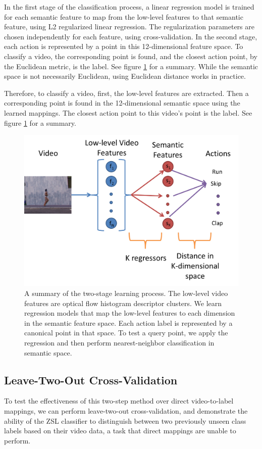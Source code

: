 \documentclass{article}
\begin{document}
In the first stage of the classification process, a linear regression model is trained for each semantic feature to map from the low-level features to that semantic feature, using L2 regularized linear regression. The regularization parameters are chosen independently for each feature, using cross-validation. In the second stage, each action is represented by a point in this 12-dimensional feature space. To classify a video, the corresponding point is found, and the closest action point, by the Euclidean metric, is the label. See figure \ref{2stage} for a summary. While the semantic space is not necessarily Euclidean, using Euclidean distance works in practice.

Therefore, to classify a video, first, the low-level features are extracted. Then a corresponding point is found in the 12-dimensional semantic space using the learned mappings. The closest action point to this video's point is the label. See figure \ref{2stage} for a summary.

\begin{figure}[h]
  \centering
  \includegraphics[width=.5\linewidth]{2stagelearning.png}
  \caption{A summary of the two-stage learning process. The low-level video features are optical flow histogram descriptor clusters. We learn regression models that map the low-level features to each dimension in the semantic feature space. Each action label is represented by a canonical point in that space.  To test a query point, we apply the regression and then perform nearest-neighbor classification in semantic space.}
  \label{2stage}
\end{figure}

\subsection{Leave-Two-Out Cross-Validation}
To test the effectiveness of this two-step method over direct video-to-label mappings, we can perform leave-two-out cross-validation, and demonstrate the ability of the ZSL classifier to distinguish between two previously unseen class labels based on their video data, a task that direct mappings are unable to perform.
\end{document}
